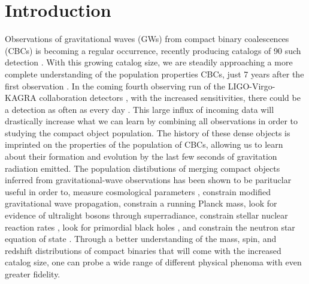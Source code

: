 \section{Introduction} \label{sec:intro}

Observations of gravitational waves (GWs) from compact binary coalescences (CBCs) is becoming a regular occurrence, 
recently producing catalogs of 90 such detection \cite{GWTC1,gwtc2,GWTC3}. With this growing catalog size, we are steadily approaching a more complete  
understanding of the population properties CBCs, just 7 years after the first observation \cite{o1o2_pop,o3a_pop,o3b_astro_dist}. 
In the coming fourth observing run of the LIGO-Virgo-KAGRA collaboration detectors \cite{aLIGO,aVIRGO, KAGRA}, with the increased sensitivities, 
there could be a detection as often as every day \cite{LVK_prospects}. This large influx of incoming data will drastically increase what we can learn by combining all observations
in order to studying the compact object population. The history of these dense objects is imprinted on the properties of the population 
of CBCs, allowing us to learn about their formation and evolution by the last few seconds of gravitation radiation emitted. The population distibutions 
of merging compact objects inferred from gravitational-wave observations has been shown to be parituclar useful in order to, measure cosmological parameters \citep{Farr_2019HUB}, 
constrain modified gravitational wave propagation, constrain a running Planck mass, look for evidence of ultralight bosons through superradiance, 
constrain stellar nuclear reaction rates \cite{Farmer_2020}, look for primordial black holes \cite{Ng_2021}, and constrain the neutron star equation of state . 
Through a better understanding of the mass, spin, and redshift distributions of compact binaries that will come with the increased catalog size, 
one can probe a wide range of different physical phenoma with even greater fidelity.

